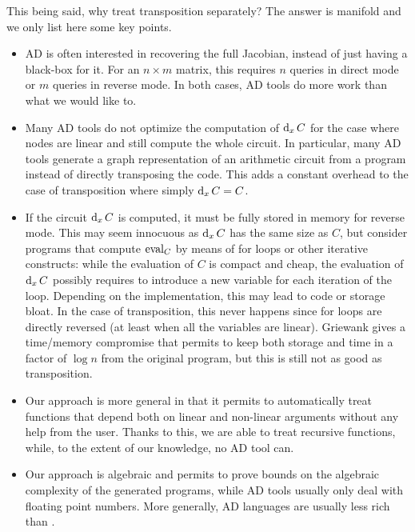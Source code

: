 This being said, why treat transposition separately?  The answer is
manifold and we only list here some key points.
\begin{itemize}
\item AD is often interested in recovering the full Jacobian, instead
  of just having a black-box for it. For an $n\times m$ matrix, this
  requires $n$ queries in direct mode or $m$ queries in reverse
  mode. In both cases, AD tools do more work than what we would like
  to.
\item Many AD tools do not optimize the computation of $\operatorname{d}_xC$ for
  the case where nodes are linear and still compute the whole
  circuit. In particular, many AD tools generate a graph
  representation of an arithmetic circuit from a program instead of
  directly transposing the code. This adds a constant overhead to the
  case of transposition where simply $\operatorname{d}_xC=C$.
\item If the circuit $\operatorname{d}_xC$ is computed, it must be fully stored
  in memory for reverse mode. This may seem innocuous as $\operatorname{d}_xC$
  has the same size as $C$, but consider programs that compute
  $\operatorname{eval}_C$ by means of for loops or other iterative constructs: while
  the evaluation of $C$ is compact and cheap, the evaluation of
  $\operatorname{d}_xC$ possibly requires to introduce a new variable for each
  iteration of the loop. Depending on the implementation, this may
  lead to code or storage bloat. In the case of transposition, this
  never happens since for loops are directly reversed (at least when
  all the variables are linear). Griewank \cite{Gri92} gives a
  time/memory compromise that permits to keep both storage and time in
  a factor of $\log n$ from the original program, but this is still
  not as good as transposition.
\item Our approach is more general in that it permits to automatically
  treat functions that depend both on linear and non-linear arguments
  without any help from the user. Thanks to this, we are able to treat
  recursive functions, while, to the extent of our knowledge, no AD
  tool can.
\item Our approach is algebraic and permits to prove bounds on the
  algebraic complexity of the generated programs, while AD tools
  usually only deal with floating point numbers. More generally, AD
  languages are usually less rich than \tAL.
\end{itemize}




%
